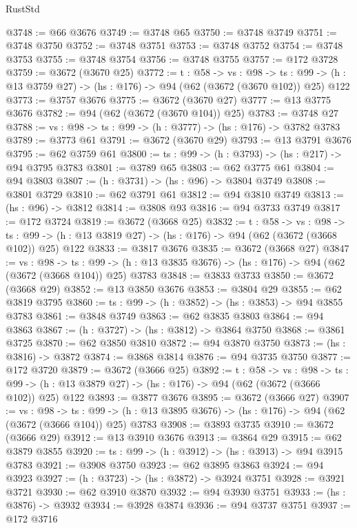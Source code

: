 \begin{lexlean}{RustStd}
\begin{coremodule}
@3748 := @66 @3676
@3749 := @3748 @65
@3750 := @3748 @3749
@3751 := @3748 @3750
@3752 := @3748 @3751
@3753 := @3748 @3752
@3754 := @3748 @3753
@3755 := @3748 @3754
@3756 := @3748 @3755
@3757 := @172 @3728
@3759 := @3672 (@3670 @25)
@3772 := {t : @58} ->
  {vs : @98} ->
  {ts : @99} -> (h : @13 @3759 @27) -> (hs : @176) -> @94 (@62 (@3672 (@3670 @102)) @25) @122
@3773 := @3757 @3676
@3775 := @3672 (@3670 @27)
@3777 := @13 @3775 @3676
@3782 := @94 (@62 (@3672 (@3670 @104)) @25)
@3783 := @3748 @27
@3788 := {vs : @98} -> {ts : @99} -> (h : @3777) -> (hs : @176) -> @3782 @3783
@3789 := @3773 @61
@3791 := @3672 (@3670 @29)
@3793 := @13 @3791 @3676
@3795 := @62 @3759 @61
@3800 := {ts : @99} -> (h : @3793) -> (hs : @217) -> @94 @3795 @3783
@3801 := @3789 @65
@3803 := @62 @3775 @61
@3804 := @94 @3803
@3807 := (h : @3731) -> (hs : @96) -> @3804 @3749
@3808 := @3801 @3729
@3810 := @62 @3791 @61
@3812 := @94 @3810 @3749
@3813 := (hs : @96) -> @3812
@3814 := @3808 @93
@3816 := @94 @3733 @3749
@3817 := @172 @3724
@3819 := @3672 (@3668 @25)
@3832 := {t : @58} ->
  {vs : @98} ->
  {ts : @99} -> (h : @13 @3819 @27) -> (hs : @176) -> @94 (@62 (@3672 (@3668 @102)) @25) @122
@3833 := @3817 @3676
@3835 := @3672 (@3668 @27)
@3847 := {vs : @98} ->
  {ts : @99} -> (h : @13 @3835 @3676) -> (hs : @176) -> @94 (@62 (@3672 (@3668 @104)) @25) @3783
@3848 := @3833 @3733
@3850 := @3672 (@3668 @29)
@3852 := @13 @3850 @3676
@3853 := @3804 @29
@3855 := @62 @3819 @3795
@3860 := {ts : @99} -> (h : @3852) -> (hs : @3853) -> @94 @3855 @3783
@3861 := @3848 @3749
@3863 := @62 @3835 @3803
@3864 := @94 @3863
@3867 := (h : @3727) -> (hs : @3812) -> @3864 @3750
@3868 := @3861 @3725
@3870 := @62 @3850 @3810
@3872 := @94 @3870 @3750
@3873 := (hs : @3816) -> @3872
@3874 := @3868 @3814
@3876 := @94 @3735 @3750
@3877 := @172 @3720
@3879 := @3672 (@3666 @25)
@3892 := {t : @58} ->
  {vs : @98} ->
  {ts : @99} -> (h : @13 @3879 @27) -> (hs : @176) -> @94 (@62 (@3672 (@3666 @102)) @25) @122
@3893 := @3877 @3676
@3895 := @3672 (@3666 @27)
@3907 := {vs : @98} ->
  {ts : @99} -> (h : @13 @3895 @3676) -> (hs : @176) -> @94 (@62 (@3672 (@3666 @104)) @25) @3783
@3908 := @3893 @3735
@3910 := @3672 (@3666 @29)
@3912 := @13 @3910 @3676
@3913 := @3864 @29
@3915 := @62 @3879 @3855
@3920 := {ts : @99} -> (h : @3912) -> (hs : @3913) -> @94 @3915 @3783
@3921 := @3908 @3750
@3923 := @62 @3895 @3863
@3924 := @94 @3923
@3927 := (h : @3723) -> (hs : @3872) -> @3924 @3751
@3928 := @3921 @3721
@3930 := @62 @3910 @3870
@3932 := @94 @3930 @3751
@3933 := (hs : @3876) -> @3932
@3934 := @3928 @3874
@3936 := @94 @3737 @3751
@3937 := @172 @3716

\end{coremodule}
\end{lexlean}
